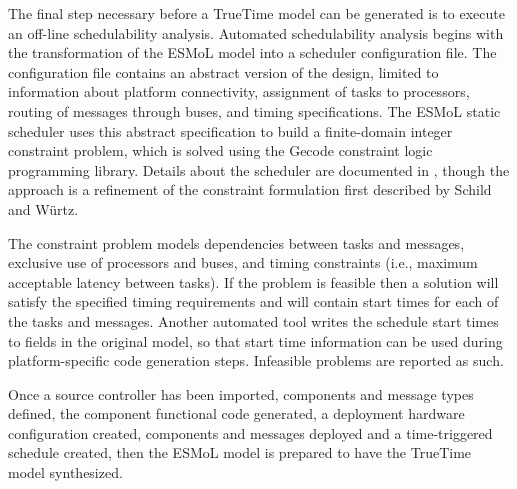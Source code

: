 The final step necessary before a TrueTime model can be generated is to execute an off-line schedulability analysis.  Automated schedulability analysis begins with the transformation of the ESMoL model into a scheduler configuration file.  The configuration file contains an abstract version of the design, limited to information about platform connectivity, assignment of tasks to processors, routing of messages through buses, and timing specifications. The ESMoL static scheduler\cite{pks_09} uses this abstract specification to build a finite-domain integer constraint problem, which is solved using the Gecode constraint logic programming library\cite{tools:gecode}.  Details about the scheduler are documented in \cite{pks_09}, though the approach is a refinement of the constraint formulation first described by Schild and W{\"u}rtz\cite{sched:offline}.

The constraint problem models dependencies between tasks and messages, exclusive use of processors and buses, and timing constraints (i.e., maximum acceptable latency between tasks).  If the problem is feasible then a solution will satisfy the specified timing requirements and will contain start times for each of the tasks and messages.  Another automated tool writes the schedule start times to fields in the original model, so that start time information can be used during platform-specific code generation steps.  Infeasible problems are reported as such.

Once a source controller has been imported, components and message types defined, the component functional code generated, a deployment hardware configuration created, components and messages deployed and a time-triggered schedule created, then the ESMoL model is prepared to have the TrueTime model synthesized.